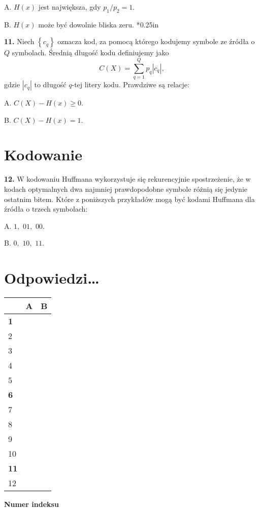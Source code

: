 \documentclass[journal,9pt,final,a4paper]{IEEEtran}%
\begin{document}
A. $H\left(  x\right)  $ jest największa, gdy $p_{1}/p_{2}=1.$

B. $H\left(  x\right)  $ może być dowolnie bliska zeru.\vspace
*{0.25in}

\vspace*{0.25in}\textbf{11. }Niech $\left\{  c_{q}\right\}  $ oznacza kod, za
pomocą którego kodujemy symbole ze źródła o $Q$ symbolach.
Średnią długość kodu definiujemy jako%
\[
C\left(  X\right)  =\sum_{q=1}^{Q}p_{q}\left\vert c_{q}\right\vert ,
\]
gdzie $\left\vert c_{q}\right\vert $ to długość $q$-tej litery kodu.
Prawdziwe są relacje:

A. $C\left(  X\right)  -H\left(  x\right)  \geq0.$

B. $C\left(  X\right)  -H\left(  x\right)  =1.$

\section{Kodowanie}

\vspace*{0.25in}\textbf{12. }W kodowaniu Huffmana wykorzystuje się
rekurencyjnie spostrzeżenie, że w kodach optymalnych dwa najmniej
prawdopodobne symbole różnią się jedynie ostatnim bitem.
Które z poniższych przykładów mogą być kodami Huffmana
dla źródła o trzech symbolach:

A. $1,$ $01,$ $00.$

B. $0,$ $10,$ $11.$

\begin{center}
\vspace*{3in}
\end{center}

\section{Odpowiedzi\ldots}

\begin{center}%
\begin{tabular}
[c]{|l|l|l|}\hline
& A & B\\\hline\hline
\textbf{1} &  & \\\hline
2 &  & \\\hline
3 &  & \\\hline
4 &  & \\\hline
5 &  & \\\hline
\textbf{6} &  & \\\hline
7 &  & \\\hline
8 &  & \\\hline
9 &  & \\\hline
10 &  & \\\hline
\textbf{11} &  & \\\hline
12 &  & \\\hline
\end{tabular}
\vspace*{0.5in}

\textbf{Numer indeksu}%

\begin{tabular}
[c]{|l|l|l|l|l|l|}\hline
&  &  &  &  & \\\hline
\end{tabular}

\end{center}
\end{document}

